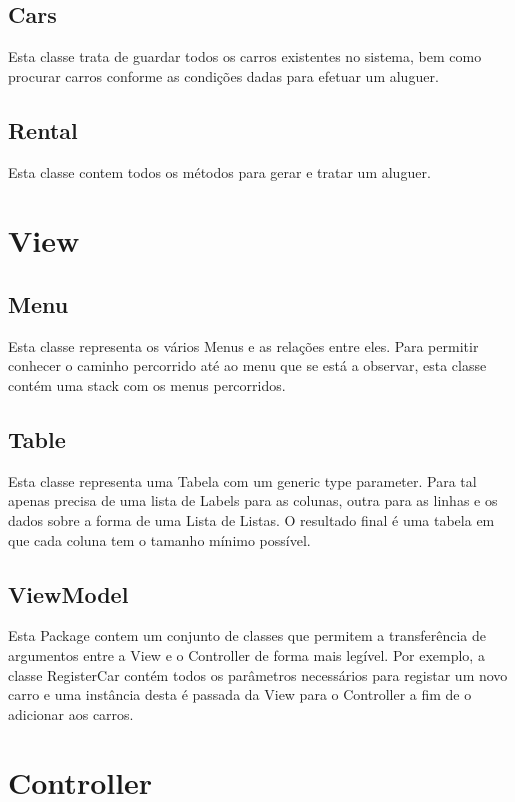 \documentclass[a4paper]{report}
\begin{document}
\subsection{Cars}

Esta classe trata de guardar todos os carros existentes no sistema, bem
como procurar carros conforme as condições dadas para efetuar um aluguer.

\subsection{Rental}

Esta classe contem todos os métodos para gerar e tratar um aluguer.
\section{View}

\subsection{Menu}

Esta classe representa os vários Menus e as relações entre eles. Para permitir
conhecer o caminho percorrido até ao menu que se está a observar, esta classe
contém uma stack com os menus percorridos.

\subsection{Table}

Esta classe representa uma Tabela com um generic type parameter. Para tal
apenas precisa de uma lista de Labels para as colunas, outra para as linhas e
os dados sobre a forma de uma Lista de Listas.
O resultado final é uma tabela em que cada coluna tem o tamanho mínimo possível.

\subsection{ViewModel}

Esta Package contem um conjunto de classes que permitem a transferência de argumentos
entre a View e o Controller de forma mais legível. Por exemplo, a classe RegisterCar
contém todos os parâmetros necessários para registar um novo carro e uma instância desta
é passada da View para o Controller a fim de o adicionar aos carros.

\section{Controller}
\end{document}
